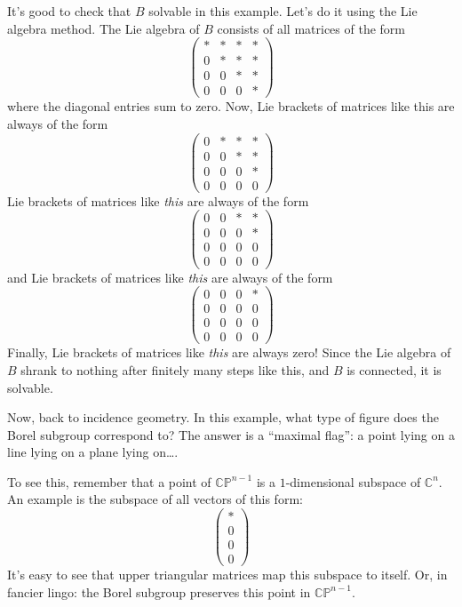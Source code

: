 \documentclass{article}
\begin{document}
It's good to check that \(B\) solvable in this example. Let's do it
using the Lie algebra method. The Lie algebra of \(B\) consists of all
matrices of the form \[
  \left(
    \begin{array}{cccc}
      *&*&*&*
    \\0&*&*&*
    \\0&0&*&*
    \\0&0&0&*
    \end{array}
  \right)
\] where the diagonal entries sum to zero. Now, Lie brackets of matrices
like this are always of the form \[
  \left(
    \begin{array}{cccc}
      0&*&*&*
    \\0&0&*&*
    \\0&0&0&*
    \\0&0&0&0
    \end{array}
  \right)
\] Lie brackets of matrices like \emph{this} are always of the form \[
  \left(
    \begin{array}{cccc}
      0&0&*&*
    \\0&0&0&*
    \\0&0&0&0
    \\0&0&0&0
    \end{array}
  \right)
\] and Lie brackets of matrices like \emph{this} are always of the form
\[
  \left(
    \begin{array}{cccc}
      0&0&0&*
    \\0&0&0&0
    \\0&0&0&0
    \\0&0&0&0
    \end{array}
  \right)
\] Finally, Lie brackets of matrices like \emph{this} are always zero!
Since the Lie algebra of \(B\) shrank to nothing after finitely many
steps like this, and \(B\) is connected, it is solvable.

Now, back to incidence geometry. In this example, what type of figure
does the Borel subgroup correspond to? The answer is a ``maximal flag'':
a point lying on a line lying on a plane lying on\ldots.

To see this, remember that a point of \(\mathbb{CP}^{n-1}\) is a
\(1\)-dimensional subspace of \(\mathbb{C}^n\). An example is the
subspace of all vectors of this form: \[
  \left(
    \begin{array}{c}
      *\\0\\0\\0
    \end{array}
  \right)
\] It's easy to see that upper triangular matrices map this subspace to
itself. Or, in fancier lingo: the Borel subgroup preserves this point in
\(\mathbb{CP}^{n-1}\).
\end{document}
